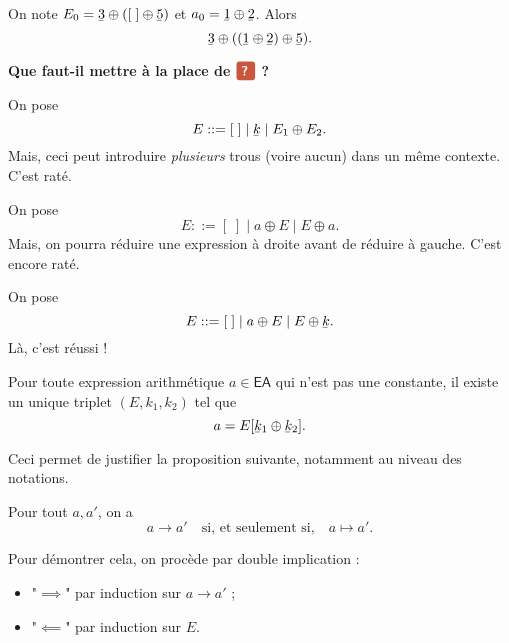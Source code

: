 \documentclass[../main]{subfiles}
\begin{document}
  \begin{exm}
    On note $E_0 = \ubar 3 \oplus ([\;] \oplus \ubar 5)$ et $a_0 = \ubar 1 \oplus \ubar 2$.
    Alors \[
      \ubar 3 \oplus ((\ubar 1 \oplus \ubar 2) \oplus \ubar 5)
    .\] 
  \end{exm}

  \textbf{Que faut-il mettre à la place de $\redQuestionBox$ ?}

  \begin{exm}
    On pose \[
      E ::= [\;]  \mid \ubar{k}  \mid E_1 \oplus E_2
    .\]
    Mais, ceci peut introduire \textit{plusieurs} trous (voire aucun) dans un même contexte.
    C'est raté.
  \end{exm}

  \begin{exm}
    On pose \[
      E ::= [\;]  \mid a \oplus E \mid E \oplus a
    .\]
    Mais, on pourra réduire une expression à droite avant de réduire à gauche.
    C'est encore raté.
  \end{exm}

  \begin{exm}
    On pose \[
      E ::= [\;]  \mid a \oplus E \mid E \oplus \ubar k
    .\]
    Là, c'est réussi !
  \end{exm}

  \begin{lem}
    Pour toute expression arithmétique $a \in \mathsf{EA}$ qui n'est pas une constante, il existe un unique triplet $(E, k_1, k_2)$ tel que \[
      a = E[\ubar{k}_1 \oplus \ubar{k}_2]
    .\]
  \end{lem}

  Ceci permet de justifier la proposition suivante, notamment au niveau des notations.

  \begin{prop}
    Pour tout $a, a'$, on a \[
    a \to a' \quad \text{si, et seulement si,} \quad a \mapsto a'
    .\]
  \end{prop}
  
  \begin{prv}
    Pour démontrer cela, on procède par double implication :
    \begin{itemize}
      \item "$\implies$" par induction sur $a \to a'$ ;
      \item "$\impliedby$" par induction sur $E$.
    \end{itemize}
  \end{prv}
\end{document}
